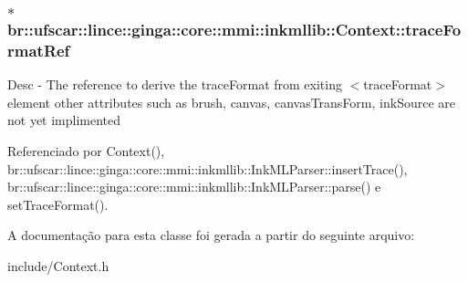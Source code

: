 \subsubsection[{traceFormatRef}]{$\ast$ {\bf br::ufscar::lince::ginga::core::mmi::inkmllib::Context::traceFormatRef}}\label{classbr_1_1ufscar_1_1lince_1_1ginga_1_1core_1_1mmi_1_1inkmllib_1_1Context_a01be540d10b62209fea31ceb71e445be}
Desc -\/ The reference to derive the traceFormat from exiting $<$traceFormat$>$ element other attributes such as brush, canvas, canvasTransForm, inkSource are not yet implimented 

Referenciado por Context(), br::ufscar::lince::ginga::core::mmi::inkmllib::InkMLParser::insertTrace(), br::ufscar::lince::ginga::core::mmi::inkmllib::InkMLParser::parse() e setTraceFormat().



A documentação para esta classe foi gerada a partir do seguinte arquivo:\begin{DoxyCompactItemize}
\item 
include/Context.h\end{DoxyCompactItemize}
